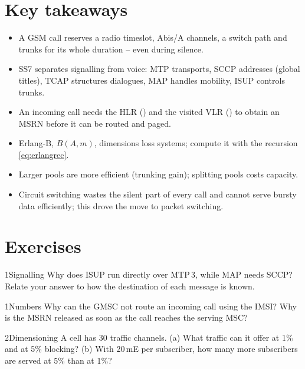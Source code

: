 \documentclass[11pt,a4paper]{article}
\begin{document}
\section{Key takeaways}
\begin{takeawaybox}
\begin{itemize}
  \item A GSM call reserves a radio timeslot, Abis/A channels, a switch path and trunks
        for its whole duration -- even during silence.
  \item SS7 separates signalling from voice: MTP transports, SCCP addresses (global titles),
        TCAP structures dialogues, MAP handles mobility, ISUP controls trunks.
  \item An incoming call needs the HLR () and the visited VLR () to obtain an
        MSRN before it can be routed and paged.
  \item Erlang-B, $B(A,m)$, dimensions loss systems; compute it with the recursion
        \cref{eq:erlangrec}.
  \item Larger pools are more efficient (trunking gain); splitting pools costs capacity.
  \item Circuit switching wastes the silent part of every call and cannot serve bursty
        data efficiently; this drove the move to packet switching.
\end{itemize}
\end{takeawaybox}

\section{Exercises}

\begin{exercisebox}{1}{Signalling}\label{exr:ss7}
Why does ISUP run directly over MTP\,3, while MAP needs SCCP? Relate your answer to how
the destination of each message is known.
\end{exercisebox}

\begin{exercisebox}{1}{Numbers}\label{exr:msrn}
Why can the GMSC not route an incoming call using the IMSI? Why is the MSRN released as
soon as the call reaches the serving MSC?
\end{exercisebox}

\begin{exercisebox}{2}{Dimensioning}\label{exr:dim}
A cell has 30 traffic channels. (a) What traffic can it offer at 1\% and at 5\% blocking?
(b) With 20\,mE per subscriber, how many more subscribers are served at 5\% than at 1\%?
\end{exercisebox}
\end{document}
